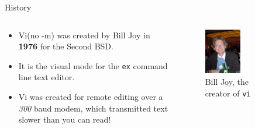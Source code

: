 \documentclass{beamer}
\begin{document}
\begin{frame}{History}
	\begin{columns}
		\begin{column}{0.5\textwidth}
			\begin{itemize}
				\item Vi(no -m) was created by Bill Joy in \textbf{1976} for the
					Second BSD.\footnotemark
					\pause

				\item It is the visual mode for the \texttt{ex}
					command line text editor.
					\pause

				\item Vi was created for remote editing over a \textit{300} baud
					modem, which transmitted text slower than you can read!
					\pause
			\end{itemize}
		\end{column}
		\begin{column}{0.5\textwidth}
			\begin{figure}
				\centering
				\includegraphics[width=0.5\textwidth]{bill_joy.jpg}
				\caption{Bill Joy, the creator of \texttt{vi}}
			\end{figure}
		\end{column}
	\end{columns}

\end{frame}
\end{document}
